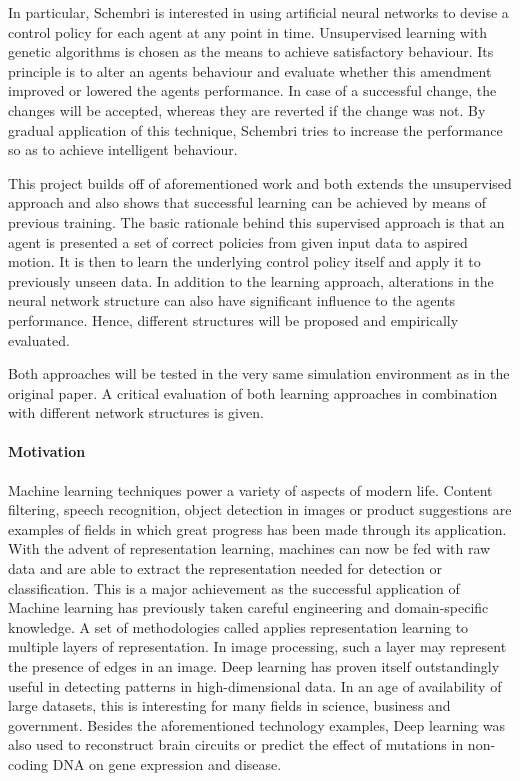 \documentclass[10pt,a4paper,DIV=11]{scrreprt}
\begin{document}
In particular, Schembri is interested in using artificial neural networks to devise a control policy for each agent at any point in time. 
Unsupervised learning with genetic algorithms is chosen as the means to achieve satisfactory behaviour. Its principle is to alter 
an agents behaviour and evaluate whether this amendment improved or lowered the agents performance. In case of a successful change, the changes
will be accepted, whereas they are reverted if the change was not. By gradual application of this technique, Schembri tries to increase
the performance so as to achieve intelligent behaviour.


This project builds off of aforementioned work and both extends the unsupervised approach and also shows that successful learning can be 
achieved by means of previous training. The basic rationale behind this supervised approach is that an agent is presented a set of correct 
policies from given input data to aspired motion. It is then to learn the underlying control policy itself and apply it to
previously unseen data. In addition to the learning approach, alterations in the neural network structure can also have significant influence
to the agents performance. Hence, different structures will be proposed and empirically evaluated.


Both approaches will be tested in the very same simulation environment as in the original paper. A critical evaluation of both learning approaches
in combination with different network structures is given.

\paragraph{Motivation}
Machine learning techniques power a variety of aspects of modern life. Content filtering, speech recognition, object detection in
images or product suggestions are examples of fields in which great progress has been made through its application.  
With the advent of representation learning, machines can now be fed with raw data and are able to extract the representation needed for detection
or classification. This is a major achievement as the successful application of Machine learning has previously taken careful engineering and
domain-specific knowledge. A set of methodologies called  applies representation learning to multiple layers of representation. 
In image processing, such a layer may represent the presence of edges in an image. Deep learning has proven itself outstandingly useful in detecting 
patterns in high-dimensional data. In an age of availability of large datasets, this is interesting for many fields in science, business and government.
Besides the aforementioned technology examples, Deep learning was also used to reconstruct brain circuits or predict the effect of mutations in
non-coding DNA on gene expression and disease. \cite{DEEPLEARNING}
\end{document}
